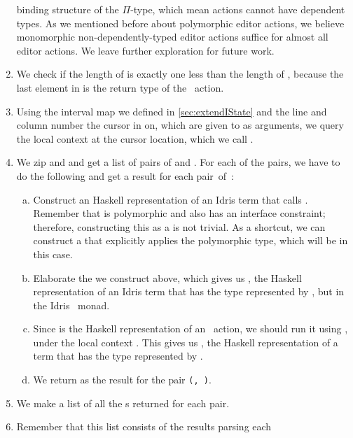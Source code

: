 \begin{enumerate}
{    binding structure of the $\Pi$-type, which mean  actions
    cannot have dependent types. As we mentioned before about polymorphic
    editor actions, we believe monomorphic non-dependently-typed editor actions
    suffice for almost all editor actions. We leave further exploration for
    future work.}
  \item We check if the length of  is exactly one less than the
    length of , because the last element in  is the
    return type of the \Elab\ action.
  \item Using the interval map we defined in \autoref{sec:extendIState} and the
    line and column number the cursor in on, which are given to 
    as arguments, we query the local context at the cursor location, which we
    call .
  \item We zip  and  and get a list of pairs of
     and .
    For each of the pairs, we have to do the following and get a result for
    each \mbox{pair of }:
    \begin{enumerate}[(a)]
      \item \label{item:fromEditor} Construct an Haskell representation of an
        Idris term that calls . Remember that  is
        polymorphic and also has an interface constraint; therefore,
        constructing this as a  is not trivial.  As a shortcut, we can
        construct a  that explicitly applies the polymorphic type,
        which will be  in this case.
      \item Elaborate the  we construct above, which gives us
        , the Haskell representation of an Idris term that has the type
        represented by , but in the Idris \Elab\ monad.
      \item Since  is the Haskell representation of an \Elab\ action, we
        should run it using , under the local context
        . This gives us , the Haskell representation of a term
        that has the type represented by .
      \item We return  as the result for the pair
        \texttt{(, )}.
    \end{enumerate}
  \item We make a list of all the s returned for each pair.
  \item Remember that this list consists of the results parsing each

\end{enumerate}
